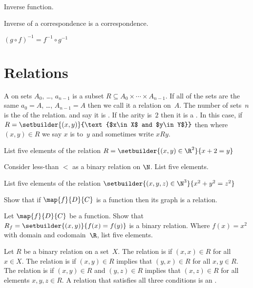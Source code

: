 \documentclass{ibl}
\begin{document}
\begin{df}
Inverse function.  
\end{df}

\begin{ex}
\begin{exes}
\item Inverse of a correspondence is a correspondence.  
\item $(g\circ f)^{-1}=f^{-1}\circ g^{-1}$
\end{exes}
\end{ex}




\section{Relations}
\begin{df}
A  on sets $A_0$, \ldots, $a_{n-1}$ is a subset
$R\subseteq A_0\times \cdots \times A_{n-1}$. 
If all of the sets are the same $a_0=A$, \ldots, $A_{n-1}=A$
then we call it a relation on~$A$.
The number of sets~$n$ is the  of the relation.
and say it is .
If the arity is~$2$ then it is a .
In this case, if $R=\setbuilder{(x,y)}{\text{$x\in X$ and $y\in Y$}}$
then where $(x,y)\in R$ we say $x$ is  to~$y$
and sometimes write $xRy$.
\end{df}

\begin{ex}
\begin{exes}
\item List five elements of the relation
  $R=\setbuilder{(x,y)\in \R^2}{x+2=y}$
\item Consider less-than $<$ as a binary relation on $\N$.
  List five elements.
\item List five elements of the relation
  $\setbuilder{(x,y,z)\in\N^3}{x^2+y^2=z^2}$
\item Show that if $\map{f}{D}{C}$ is a function then 
  its graph is a relation.
\item Let $\map{f}{D}{C}$ be a function.
  Show that 
  $R_f=\setbuilder{(x,y)}{f(x)=f(y)}$
  is a binary relation.
  Where $f(x)=x^2$ with domain and codomain~$\R$,
  list five elements. 
\end{exes}
\end{ex}

\begin{df} 
Let $R$ be a binary relation on a set~$X$.
The relation is  if $(x,x)\in R$ for all $x\in X$.
The relation is  if $(x,y)\in R$ implies that
$(y,x)\in R$ for all $x,y\in R$.
The relation is  if 
$(x,y)\in R$ and $(y,z)\in R$ implies that 
$(x,z)\in R$ for all elements $x,y,z\in R$.
A relation that satisfies all three conditions is an
.  
\end{df}
\end{document}
